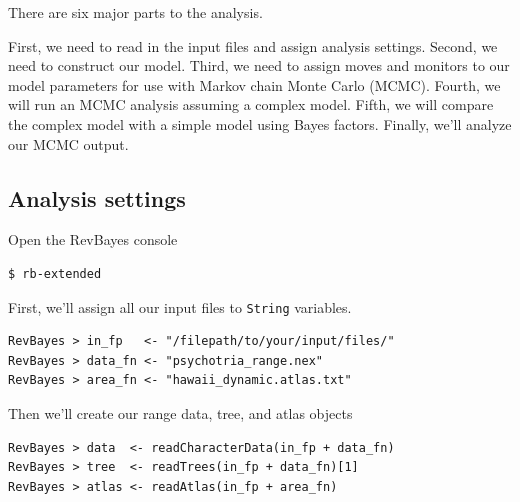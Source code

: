 \documentclass[11pt]{article}
\begin{document}
There are six major parts to the analysis.

First, we need to read in the input files and assign analysis settings.
Second, we need to construct our model.
Third, we need to assign moves and monitors to our model parameters for use with Markov chain Monte Carlo (MCMC).
Fourth, we will run an MCMC analysis assuming a complex model.
Fifth, we will compare the complex model with a simple model using Bayes factors.
Finally, we'll analyze our MCMC output.

\subsection{Analysis settings}

\setlength{\parindent}{0pt}

Open the RevBayes console

\begin{snugshade}
\begin{lstlisting}
$ rb-extended
\end{lstlisting}
\end{snugshade}

First, we'll assign all our input files to {\tt String} variables.
\begin{snugshade}
\begin{lstlisting}
RevBayes > in_fp   <- "/filepath/to/your/input/files/"
RevBayes > data_fn <- "psychotria_range.nex"
RevBayes > area_fn <- "hawaii_dynamic.atlas.txt"
\end{lstlisting}
\end{snugshade}

Then we'll create our range data, tree, and atlas objects

\begin{snugshade}
\begin{lstlisting}
RevBayes > data  <- readCharacterData(in_fp + data_fn)
RevBayes > tree  <- readTrees(in_fp + data_fn)[1]
RevBayes > atlas <- readAtlas(in_fp + area_fn)
\end{lstlisting}
\end{snugshade}

%
\end{document}
